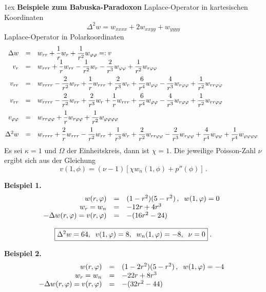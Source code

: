 \documentclass[12pt,a4paper,leqno]{book}
\begin{document}
\addtolength{\abovedisplayshortskip}{-1ex}
\setlength{\fboxsep}{1ex}
\parskip1ex
%
\bc
{\bf Beispiele zum Babuska-Paradoxon}
\ec
%
{\sc Laplace}-Operator in kartesischen Koordinaten
\[
\Delta^2 w = w_{xxxx} + 2w_{xxyy} + w_{yyyy}
\]
{\sc Laplace}-Operator in Polarkoordinaten
\[
\ba{.}{rcl}
\Delta w &=& \dis w_{rr} + \frac{1}{r}w_r + \frac{1}{r^2}w_{\phi \phi } =: v\\
v_r &=& \dis w_{rrr} + \frac{1}{r}w_{rr} - \frac{1}{r^2}w_r
- \frac{2}{r^3}w_{\phi \phi } + \frac{1}{r^2}w_{r\phi \phi }\\[2ex]
v_{rr} &=& \dis
w_{rrrr} - \frac{2}{r^2}w_{rr} + \frac{1}{r}w_{rrr}
 + \frac{2}{r^3}w_r
 + \frac{6}{r^4}w_{\phi \phi } - \frac{4}{r^3}w_{r\phi \phi }
 + \frac{1}{r^2}w_{rr\phi \phi }\\[2ex]
v_{rr} &=& \dis w_{rrrr} - \frac{2}{r^2}w_{rr} + \frac{2}{r^3}w_r
 + \frac{1}{r}w_{rrr}
 + \frac{6}{r^4}w_{\phi \phi } - \frac{4}{r^3}w_{r\phi \phi } +
\frac{1}{r^2}w_{rr\phi \phi }\\[2ex]
v_{\phi \phi } &=& \dis w_{rr\phi \phi } + \frac{1}{r}w_{r\phi \phi } +
\frac{1}{r^2}w_{\phi \phi \phi \phi }\\[2ex]
\Delta^2w &=& \dis w_{rrrr} + \frac{2}{r}w_{rrr}- \frac{1}{r^2}w_{rr}
+ \frac{1}{r^3}w_r + \frac{2}{r^2}w_{rr\phi \phi }
 - \frac{2}{r^3}w_{r\phi \phi }
 + \frac{4}{r^4}w_{\phi \phi } + \frac{1}{r^4}w_{\phi \phi \phi \phi }
\ea{.}
\]
Es sei $\kappa = 1$ und $\Omega$ der Einheitskreis,
dann ist $\chi = 1$. Die jeweilige {\sc Poisson}-Zahl $\nu$ ergibt sich aus der
Gleichung
\[
v(1,\phi) = (\nu - 1)[\chi w_n(1,\phi) + p''(\phi)] \,.
\]

\par
{\bf Beispiel 1.}
\[
\ba{.}{rcl}
w(r,\phi ) &=& (1 - r^2)(5 - r^2)\,,\;\; w(1,\phi) = 0\\
w_r = w_n &=& -12r + 4r^3\\
- \Delta w(r,\phi ) = v(r,\phi ) &=& -(16r^2 - 24)
\ea{.}
\]

\[
\fbox{$
\Delta^2w          = 64, \;\;
v(1,\phi ) =  8, \;\;
w_n(1,\phi )        = - 8 ,\;\; \nu = 0
$} \; .
\]
\par
{\bf Beispiel 2.}
\[
\ba{.}{rcl}
w(r,\phi ) &=& (1 - 2r^2)(5 - r^2)\,,\;\; w(1,\phi) = - 4\\
w_r = w_n &=& -22r + 8r^3\\
-\Delta w(r,\phi ) = v(r,\phi ) &=& -(32r^2 - 44)
\ea{.}
\]
\end{document}
